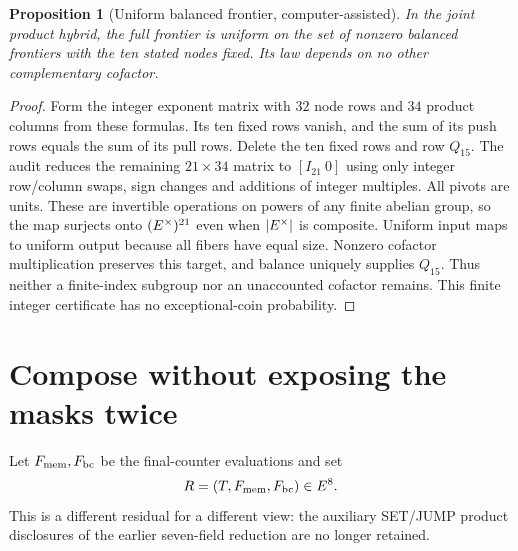 \documentclass[11pt]{article}
\newtheorem{proposition}{Proposition}
\begin{document}
\begin{proposition}[Uniform balanced frontier, computer-assisted]
In the joint product hybrid, the full frontier is uniform on the set of nonzero balanced frontiers with the ten stated nodes fixed. Its law depends on no other complementary cofactor.
\end{proposition}
\begin{proof}
Form the integer exponent matrix with $32$ node rows and $34$ product columns from these formulas. Its ten fixed rows vanish, and the sum of its push rows equals the sum of its pull rows. Delete the ten fixed rows and row $Q_{15}$. The audit reduces the remaining $21\times34$ matrix to $[I_{21}\ 0]$ using only integer row/column swaps, sign changes and additions of integer multiples. All pivots are units. These are invertible operations on powers of any finite abelian group, so the map surjects onto $(E^\times)^{21}$ even when $|E^\times|$ is composite. Uniform input maps to uniform output because all fibers have equal size. Nonzero cofactor multiplication preserves this target, and balance uniquely supplies $Q_{15}$. Thus neither a finite-index subgroup nor an unaccounted cofactor remains. This finite integer certificate has no exceptional-coin probability.
\end{proof}

\section{Compose without exposing the masks twice}

Let $F_{\rm mem},F_{\rm bc}$ be the final-counter evaluations and set
\[
 R=(T,F_{\rm mem},F_{\rm bc})\in E^8.
\]
This is a different residual for a different view: the auxiliary SET/JUMP product disclosures of the earlier seven-field reduction are no longer retained.
\end{document}
